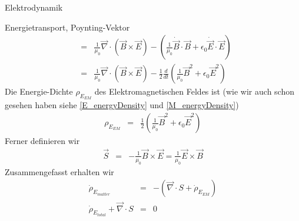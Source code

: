 \begin{chapter}{\titlestr}
\begin{section}{Elektrodynamik}
\begin{subsubsection}{Energietransport, Poynting-Vektor}
\begin{eqnarray*}
&=&\frac{1}{\mu_0}\vec{\nabla}\cdot\left(\vec{B}\times \vec{E}\right)-\left(\frac{1}{\mu_0}\dot{\vec{B}}\cdot\vec{B}+\epsilon_0\dot{\vec{E}}\cdot\vec{E}\right)\\
&=&\frac{1}{\mu_0}\vec{\nabla}\cdot\left(\vec{B}\times \vec{E}\right)-\frac{1}{2}\frac{d}{dt}\left(\frac{1}{\mu_0}\vec{B}^2+\epsilon_0\vec{E}^2\right)
\end{eqnarray*}
Die Energie-Dichte $\rho_{E_{EM}}$ des Elektromagnetischen Feldes ist (wie wir auch schon gesehen haben
siehe \ref{E_energyDensity} und \ref{M_energyDensity})
\begin{eqnarray}
\label{EM_energyDensity}
\rho_{E_{EM}} &=& \frac{1}{2}\left(\frac{1}{\mu_0}\vec{B}^2+\epsilon_0\vec{E}^2\right)
\end{eqnarray}
Ferner definieren wir
\begin{eqnarray}
\label{S_def}
\vec{S} &=& -\frac{1}{\mu_0}\vec{B}\times \vec{E}=\frac{1}{\mu_0}\vec{E}\times \vec{B}
\end{eqnarray}
Zusammengefasst erhalten wir
\begin{eqnarray*}
\dot{\rho}_{E_{matter}}&=&-\left(\vec{\nabla}\cdot S+\dot{\rho}_{E_{EM}}\right)\\
\dot{\rho}_{E_{total}}+\vec{\nabla}\cdot S &=& 0
\end{eqnarray*}
\end{subsubsection}
\end{section}



\end{chapter}
